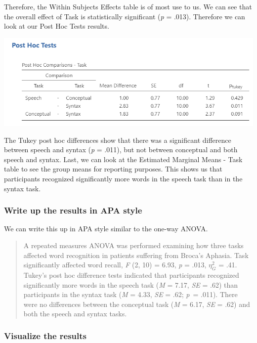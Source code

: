 \documentclass[
]{book}
\begin{document}
Therefore, the Within Subjects Effects table is of most use to us. We can see that the overall effect of Task is statistically significant (\emph{p} = .013). Therefore we can look at our Post Hoc Tests results.

\includegraphics{images/05-repeated-measures-anova/rm-anova_tukey.png}

The Tukey post hoc differences show that there was a significant difference between speech and syntax (\emph{p} = .011), but not between conceptual and both speech and syntax. Last, we can look at the Estimated Marginal Means - Task table to see the group means for reporting purposes. This shows us that participants recognized significantly more words in the speech task than in the syntax task.

\hypertarget{write-up-the-results-in-apa-style-7}{%
\subsubsection{Write up the results in APA style}\label{write-up-the-results-in-apa-style-7}}

We can write this up in APA style similar to the one-way ANOVA.

\begin{quote}
A repeated measures ANOVA was performed examining how three tasks affected word recognition in patients suffering from Broca's Aphasia. Task significantly affected word recall, \emph{F} (2, 10) = 6.93, \emph{p} = .013, \(\eta^2_G\) = .41. Tukey's post hoc difference tests indicated that participants recognized significantly more words in the speech task (\emph{M} = 7.17, \emph{SE} = .62) than participants in the syntax task (\emph{M} = 4.33, \emph{SE} = .62; \emph{p}~= .011). There were no differences between the conceptual task (\emph{M} = 6.17, \emph{SE} = .62) and both the speech and syntax tasks.
\end{quote}

\hypertarget{visualize-the-results-6}{%
\subsubsection{Visualize the results}\label{visualize-the-results-6}}
\end{document}
